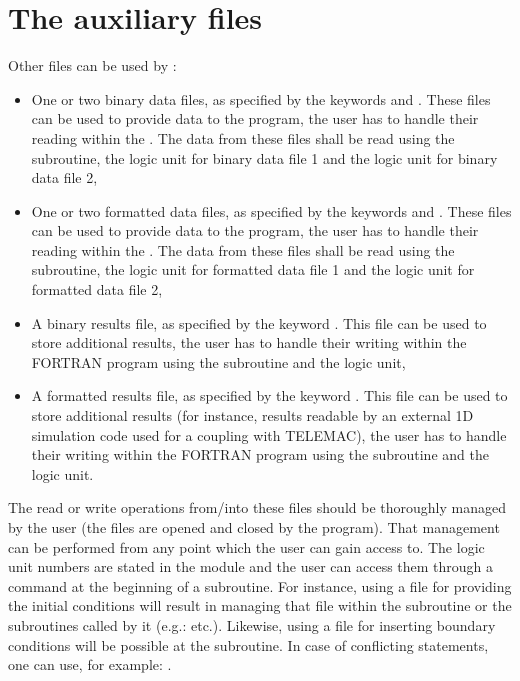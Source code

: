 \section{The auxiliary files}

Other files can be used by :

\begin{itemize}
\item One or two binary data files, as specified by the keywords
 and . These files can be
used to provide data to the program, the user has to handle their reading
within the . The data from these files shall be read using
the  subroutine,
the  logic unit for binary data file 1 and the 
logic unit for binary data file 2,

\item One or two formatted data files, as specified by the keywords
 and . These files
can be used to provide data to the program, the user has to handle their
reading within the . The data from these files shall be
read using the  subroutine,
the  logic unit for formatted data file 1 and the
 logic unit for formatted data file 2,

\item A binary results file, as specified by the keyword . This file can be used to store
additional results, the user has to handle their writing within the FORTRAN
program using the  subroutine
and the  logic unit,

\item A formatted results file, as specified by the keyword . This file can be used to store additional results (for instance,
results readable by an external 1D simulation code used for a coupling with
TELEMAC), the user has to handle their writing within the FORTRAN program using
the  subroutine and the  logic unit.
\end{itemize}

The read or write operations from/into these files should be thoroughly managed
by the user (the files are opened and closed by the program). That management
can be performed from any point which the user can gain access to.
The logic unit numbers are stated in the 
module and the user can access them through a
 command at the beginning of a
subroutine. For instance, using a file for providing the initial conditions
will result in managing that file within the  subroutine
or the subroutines called by it (e.g.:  etc.).
Likewise, using a file for inserting boundary conditions will be possible at
the  subroutine.
In case of conflicting statements, one can use,
for example: .

